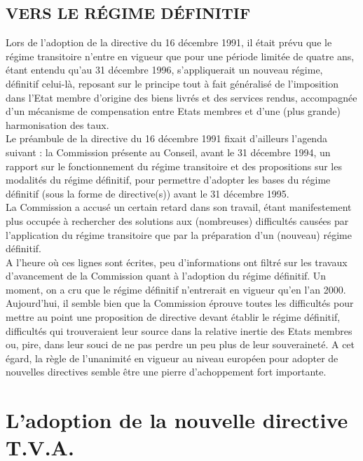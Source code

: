 \documentclass{book}
\begin{document}
\subsection{VERS LE RÉGIME DÉFINITIF}

Lors de l'adoption de la directive du 16 décembre 1991, il était prévu que le régime transitoire
n'entre en vigueur que pour une période limitée de quatre ans, étant entendu qu'au 31
décembre 1996, s'appliquerait un nouveau régime, définitif celui-là, reposant sur le principe
tout à fait généralisé de l'imposition dans l'Etat membre d'origine des biens livrés et des
services rendus, accompagnée d'un mécanisme de compensation entre Etats membres et d'une
(plus grande) harmonisation des taux.\\

Le préambule de la directive du 16 décembre 1991 fixait d'ailleurs l'agenda suivant : la
Commission présente au Conseil, avant le 31 décembre 1994, un rapport sur le
fonctionnement du régime transitoire et des propositions sur les modalités du régime définitif,
pour permettre d'adopter les bases du régime définitif (sous la forme de directive(s)) avant le
31 décembre 1995.\\

La Commission a accusé un certain retard dans son travail, étant manifestement plus occupée
à rechercher des solutions aux (nombreuses) difficultés causées par l'application du régime
transitoire que par la préparation d'un (nouveau) régime définitif.\\	

A l'heure où ces lignes sont écrites, peu d'informations ont filtré sur les travaux d'avancement
de la Commission quant à l’adoption du régime définitif. Un moment, on a cru que le régime
définitif n’entrerait en vigueur qu’en l’an 2000.\\

Aujourd’hui, il semble bien que la Commission éprouve toutes les difficultés pour mettre au
point une proposition de directive devant établir le régime définitif, difficultés qui trouveraient leur source dans la relative inertie des Etats membres ou, pire, dans leur souci de
ne pas perdre un peu plus de leur souveraineté. A cet égard, la règle de l’unanimité en
vigueur au niveau européen pour adopter de nouvelles directives semble être une pierre
d’achoppement fort importante.\\

\section{ L’adoption de la nouvelle directive T.V.A.}
\end{document}
